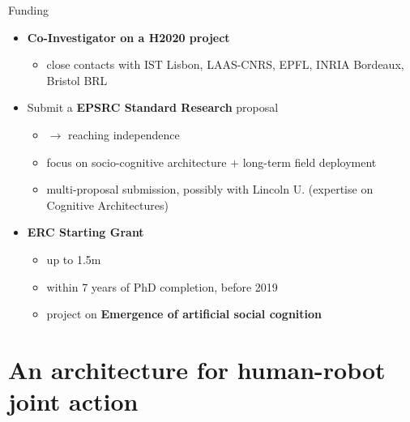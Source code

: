 \documentclass[xcolor=table]{beamer}
\begin{document}
\begin{frame}{Funding}
{    \begin{itemize}
        \item {\bf Co-Investigator on a H2020 project}
            \begin{itemize}
                \item close contacts with IST Lisbon, LAAS-CNRS, EPFL,
                    INRIA Bordeaux, Bristol BRL
            \end{itemize}
        \item Submit a {\bf EPSRC Standard Research} proposal
            \begin{itemize}
                \item $\rightarrow$ reaching independence
                \item focus on socio-cognitive architecture + long-term field deployment
                \item multi-proposal submission, possibly with
                    Lincoln U. (expertise on Cognitive Architectures)
            \end{itemize}
        \item {\bf ERC Starting Grant}
            \begin{itemize}
                \item up to \EUR 1.5m
                \item within 7 years of PhD completion, \ie before 2019
                \item project on {\bf Emergence of artificial social cognition}
            \end{itemize}
    \end{itemize}
    }

\end{frame}


\section{An architecture for human-robot joint action}


\end{document}
